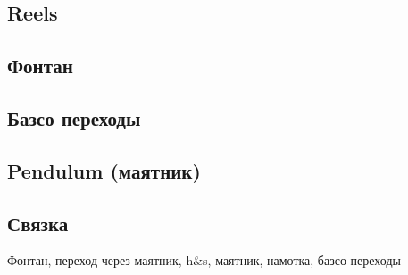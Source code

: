 \documentclass[a4paper, 12pt]{article}
\begin{document}
	\subsection{Reels}
	\subsection{Фонтан}
	\subsection{Базсо переходы}
	\subsection{Pendulum (маятник)}
	\subsection{Связка}
	
	Фонтан, переход через маятник, h\&s, маятник, намотка, базсо переходы
	
	
	
	
\end{document}

